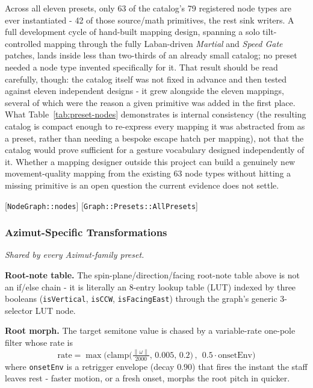 \documentclass[sigconf,nonacm]{acmart}
\newcommand{\coderef}[1]{{\small [#1]}}
\newcommand{\preset}[1]{\textit{#1}}
\begin{document}
Across all eleven presets, only 63 of the catalog's 79 registered node types are ever
instantiated - 42 of those source/math primitives, the rest sink writers. A full development cycle
of hand-built mapping design, spanning a solo tilt-controlled mapping through the fully Laban-driven
\preset{Martial} and \preset{Speed Gate} patches, lands inside less than two-thirds of an already small catalog; no preset
needed a node type invented specifically for it. That result should be read carefully, though: the
catalog itself was not fixed in advance and then tested against eleven independent designs - it grew
alongside the eleven mappings, several of which were the reason a given primitive was added in the
first place. What Table~\ref{tab:preset-nodes} demonstrates is internal consistency (the resulting catalog is compact
enough to re-express every mapping it was abstracted from as a preset, rather than needing a
bespoke escape hatch per mapping), not that the catalog would prove sufficient for a gesture
vocabulary designed independently of it. Whether a mapping designer outside this project can build
a genuinely new movement-quality mapping from the existing 63 node types without hitting a missing
primitive is an open question the current evidence does not settle.
\begin{flushright}
\coderef{\texttt{NodeGraph::nodes}} \coderef{\texttt{Graph::Presets::AllPresets}}
\end{flushright}

\subsubsection*{Azimut-Specific Transformations}
\textit{Shared by every Azimut-family preset.}

\textbf{Root-note table.} The spin-plane/direction/facing root-note table above is not an if/else
chain - it is literally an 8-entry lookup table (LUT) indexed by three booleans (\texttt{isVertical},
\texttt{isCCW}, \texttt{isFacingEast}) through the graph's generic 3-selector LUT node.

\textbf{Root morph.} The target semitone value is chased by a variable-rate one-pole filter whose
rate is
\[
\text{rate} = \max\Big(\mathrm{clamp}\big(\tfrac{\lVert\omega\rVert}{2000},\,0.005,\,0.2\big)\,,\ \
0.5\cdot\text{onsetEnv}\Big)
\]
where \texttt{onsetEnv} is a retrigger envelope (decay $0.90$) that fires the instant the staff
leaves rest - faster motion, or a fresh onset, morphs the root pitch in quicker.
\end{document}
